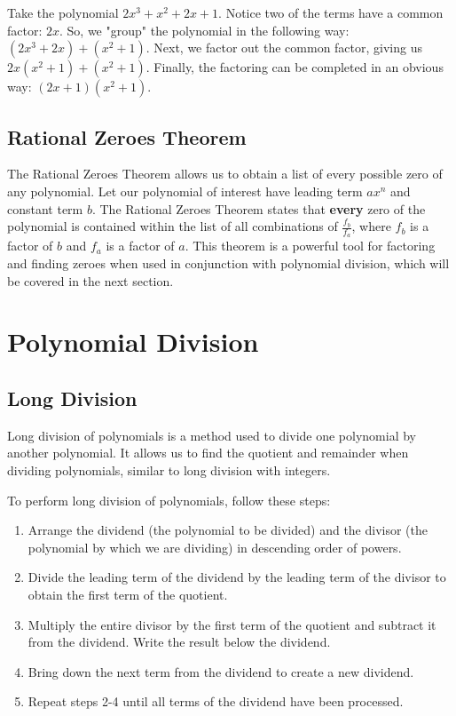 \documentclass[11pt]{article}
\begin{document}
Take the polynomial $2x^3 + x^2 + 2x + 1$. Notice two of the terms have a common factor: $2x$. So, we "group" the polynomial in the following way: $(2x^3 + 2x) + (x^2 + 1)$. Next, we factor out the common factor, giving us $2x(x^2 + 1) + (x^2 + 1)$. Finally, the factoring can be completed in an obvious way: $(2x + 1)(x^2 + 1)$.

\subsection{Rational Zeroes Theorem}
The Rational Zeroes Theorem allows us to obtain a list of every possible zero of any polynomial. Let our polynomial of interest have leading term $ax^n$ and constant term $b$. The Rational Zeroes Theorem states that \textbf{every} zero of the polynomial is contained within the list of all combinations of $\frac{f_b}{f_a}$, where $f_b$ is a factor of $b$ and $f_a$ is a factor of $a$. This theorem is a powerful tool for factoring and finding zeroes when used in conjunction with polynomial division, which will be covered in the next section. 

\section{Polynomial Division}
\subsection{Long Division}

Long division of polynomials is a method used to divide one polynomial by another polynomial. It allows us to find the quotient and remainder when dividing polynomials, similar to long division with integers.

To perform long division of polynomials, follow these steps:

\begin{enumerate}
  \item Arrange the dividend (the polynomial to be divided) and the divisor (the polynomial by which we are dividing) in descending order of powers.
  
  \item Divide the leading term of the dividend by the leading term of the divisor to obtain the first term of the quotient.
  
  \item Multiply the entire divisor by the first term of the quotient and subtract it from the dividend. Write the result below the dividend.
  
  \item Bring down the next term from the dividend to create a new dividend.
  
  \item Repeat steps 2-4 until all terms of the dividend have been processed.
  
\end{enumerate}
\end{document}
